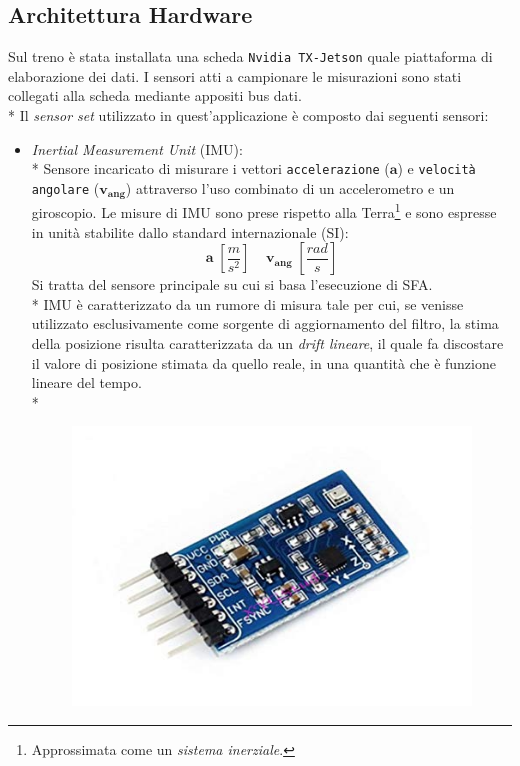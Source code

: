 \subsection{Architettura Hardware}
Sul treno \`e stata installata una scheda \texttt{Nvidia TX-Jetson} quale piattaforma di elaborazione dei dati. I sensori atti a campionare le misurazioni sono stati collegati alla scheda mediante appositi bus dati.\\*
Il \emph{sensor set} utilizzato in quest'applicazione \`e composto dai seguenti sensori:
\begin{itemize}
	\item \emph{Inertial Measurement Unit} (IMU):\\*
	Sensore incaricato di misurare i vettori \texttt{accelerazione} ($\mathbf{a}$) e \texttt{velocit\`a angolare} ($\mathbf{v_{ang}}$) attraverso l'uso combinato di un accelerometro e un giroscopio. Le misure di IMU sono prese rispetto alla Terra\footnote{Approssimata come un \emph{sistema inerziale}.} e sono espresse in unit\`a stabilite dallo standard internazionale (SI):
	$$
	\mathbf{a}\;\left[\frac{m}{s^2}\right]\;\;\;\;\mathbf{v_{ang}}\;\left[ \frac{rad}{s} \right]
	$$Si tratta del sensore principale su cui si basa l'esecuzione di SFA.\\*
	IMU \`e caratterizzato da un rumore di misura tale per cui, se venisse utilizzato esclusivamente come sorgente di aggiornamento del filtro,
	la stima della posizione risulta caratterizzata da un \emph{drift lineare}, il quale fa discostare il valore di posizione stimata da quello reale, in una quantit\`a che \`e funzione lineare del tempo.\\*
	\begin{figure}[h]
		\centering
		\includegraphics[width=\linewidth]{img/imu}

\end{figure}
\end{itemize}
